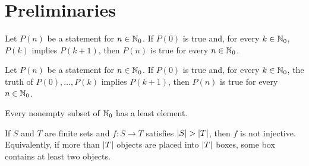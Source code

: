 \chapter{Preliminaries}

\begin{thm}
Let $P(n)$ be a statement for $n\in\Nzero$.  If $P(0)$ is true and, for every $k\in\Nzero$, $P(k)$ implies $P(k+1)$, then $P(n)$ is true for every $n\in\Nzero$.
\end{thm}

\begin{thm}
Let $P(n)$ be a statement for $n\in\Nzero$.  If $P(0)$ is true and, for every $k\in\Nzero$, the truth of $P(0),\ldots,P(k)$ implies $P(k+1)$, then $P(n)$ is true for every $n\in\Nzero$.
\end{thm}

\begin{thm}
Every nonempty subset of $\Nzero$ has a least element.
\end{thm}

\begin{thm}
If $S$ and $T$ are finite sets and $f:S\to T$ satisfies $\abs*{S}>\abs*{T}$, then $f$ is not injective.  Equivalently, if more than $\abs*{T}$ objects are placed into $\abs*{T}$ boxes, some box contains at least two objects.
\end{thm}
